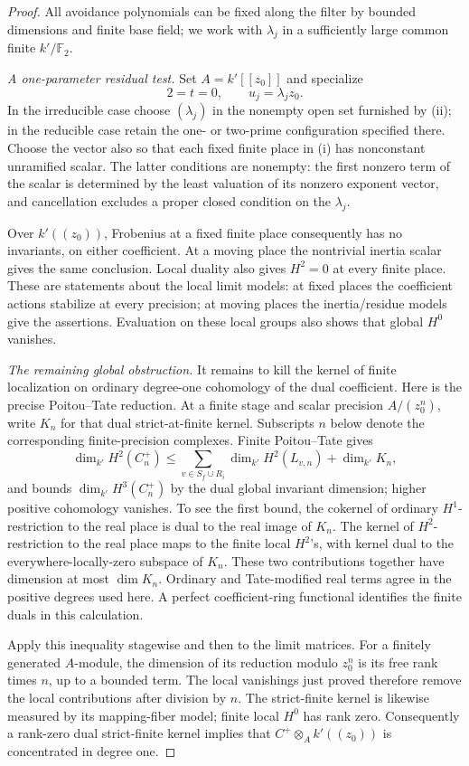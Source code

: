 \begin{proof}
All avoidance polynomials can be fixed along the filter by bounded dimensions and finite base field; we work with \(\lambda_j\) in a sufficiently large common finite \(k'/\mathbb F_2\).

\emph{A one-parameter residual test.}
Set $A=k'[[z_0]]$ and specialize
\[
  2=t=0,\qquad u_j=\lambda_jz_0.
\]
In the irreducible case choose $(\lambda_j)$ in the nonempty open set
furnished by (ii); in the reducible case retain the one- or two-prime
configuration specified there. Choose the vector also so that each fixed
finite place in (i) has nonconstant unramified scalar. The latter conditions are nonempty: the first
nonzero term of the scalar is determined by the least valuation of its
nonzero exponent vector, and cancellation excludes a proper closed
condition on the $\lambda_j$.

Over $k'((z_0))$, Frobenius at a fixed finite place consequently has
no invariants, on either coefficient. At a moving place the nontrivial
inertia scalar gives the same conclusion. Local duality also gives
$H^2=0$ at every finite place. These are statements about the local
limit models: at fixed places the coefficient actions stabilize at
every precision; at moving places the inertia/residue models give the
assertions. Evaluation on these local groups also shows that global
$H^0$ vanishes.

\emph{The remaining global obstruction.}
It remains to kill the kernel of finite localization on ordinary
degree-one cohomology of the dual coefficient. Here is the precise
Poitou--Tate reduction. At a finite stage and scalar precision $A/(z_0^n)$, write $K_n$ for
that dual strict-at-finite kernel. Subscripts $n$ below denote the
corresponding finite-precision complexes. Finite Poitou--Tate gives
\[
 \dim_{k'}H^2(C_n^+)
 \leq \sum_{v\in S_f\cup R_i}\dim_{k'}H^2(L_{v,n})
       +\dim_{k'}K_n,
\]
and bounds $\dim_{k'}H^3(C_n^+)$ by the dual global invariant
dimension; higher positive cohomology vanishes. To see the first
bound, the cokernel of ordinary $H^1$-restriction to the real place
is dual to the real image of $K_n$. The kernel of $H^2$-restriction
to the real place maps to the finite local $H^2$'s, with kernel dual
to the everywhere-locally-zero subspace of $K_n$. These two
contributions together have dimension at most $\dim K_n$.
Ordinary and Tate-modified real terms agree in the positive degrees
used here. A perfect coefficient-ring functional identifies the
finite duals in this calculation.

Apply this inequality stagewise and then to the limit matrices.
For a finitely generated $A$-module, the dimension of its reduction modulo
$z_0^n$ is its free rank times $n$, up to a bounded term. The local
vanishings just proved therefore remove the local contributions
after division by $n$. The strict-finite kernel is likewise measured
by its mapping-fiber model; finite local $H^0$ has rank zero.
Consequently a rank-zero dual strict-finite kernel implies that
$C^+\otimes_Ak'((z_0))$ is concentrated in degree one.


\end{proof}
